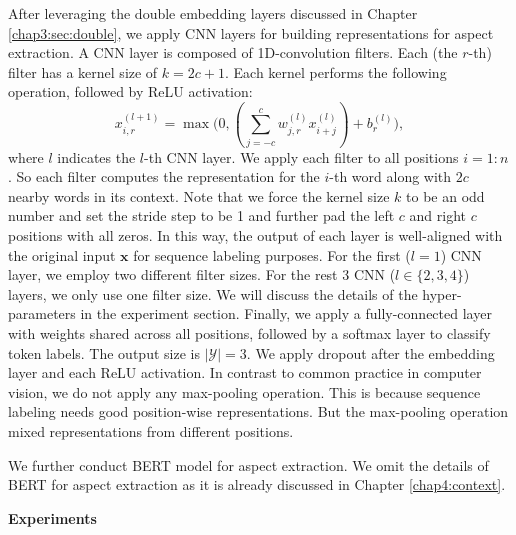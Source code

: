 After leveraging the double embedding layers discussed in Chapter \ref{chap3:sec:double}, we apply CNN layers for building representations for aspect extraction.
A CNN layer is composed of 1D-convolution filters.
Each (the $r$-th) filter has a kernel size of $k=2c+1$.
Each kernel performs the following operation, followed by ReLU activation: 
\begin{equation}
x_{i,r}^{(l+1)}=\max\bigg(0, (\sum_{j=-c}^c w_{j,r}^{(l)} x_{i+j}^{(l)})+b_r^{(l)}\bigg),
\end{equation}
where $l$ indicates the $l$-th CNN layer. 
We apply each filter to all positions $i=1:n$.
So each filter computes the representation for the $i$-th word along with $2c$ nearby words in its context.  
Note that we force the kernel size $k$ to be an odd number and set the stride step to be 1 and further pad the left $c$ and right $c$ positions with all zeros.  
In this way, the output of each layer is well-aligned with the original input $\mathbf{x}$ for sequence labeling purposes.
For the first ($l=1$) CNN layer, we employ two different filter sizes. 
For the rest 3 CNN ($l \in \{2, 3, 4\}$) layers, we only use one filter size.
We will discuss the details of the hyper-parameters in the experiment section.
Finally, we apply a fully-connected layer with weights shared across all positions, followed by a softmax layer to classify token labels.
The output size is $|\mathcal{Y}|=3$.
We apply dropout after the embedding layer and each ReLU activation.
In contrast to common practice in computer vision, we do not apply any max-pooling operation.
This is because sequence labeling needs good position-wise representations.
But the max-pooling operation mixed representations from different positions.

We further conduct BERT model for aspect extraction. We omit the details of BERT for aspect extraction as it is already discussed in Chapter \ref{chap4:context}.

\textbf{Experiments}

\begin{table}
    \label{tab:dataset} 
    \centering
    \caption{Dataset for AE}
\end{table}

